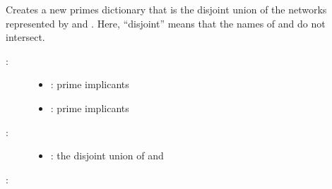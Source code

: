 \documentclass[letterpaper,10pt,english]{sphinxmanual}
\begin{document}
\begin{fulllineitems}
\label{\detokenize{PrimeImplicants:PyBoolNet.PrimeImplicants.create_disjoint_union}}
Creates a new primes dictionary that is the disjoint union of the networks represented by  and .
Here, “disjoint” means that the names of  and  do not intersect.
\begin{description}
\item[{:}] \leavevmode\begin{itemize}
\item {} 
: prime implicants

\item {} 
: prime implicants

\end{itemize}

\item[{:}] \leavevmode\begin{itemize}
\item {} 
: the disjoint union of  and 

\end{itemize}

\end{description}

:

\begin{sphinxVerbatim}[commandchars=\\\{\}]
  
  
   
\end{sphinxVerbatim}

\end{fulllineitems}
\end{document}
